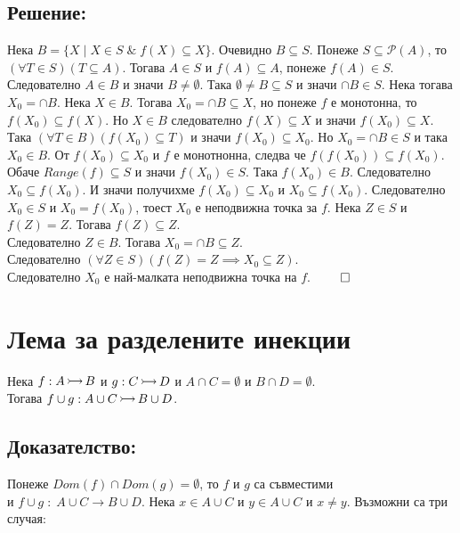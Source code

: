 \documentclass[12pt]{article}
\newcommand{\injection}[0]{\,\mathlarger{\mathlarger{\rightarrowtail}}\,}
\begin{document}
\subsection*{Решение:}
Нека \(B = \{X \; | \; X \in S \; \& \; f(X) \subseteq X\}\).
Очевидно \(B \subseteq S\). Понеже \(S \subseteq \mathcal{P}(A)\),
то \((\forall T \in S)(T \subseteq A)\). Тогава \(A \in S\)
и \(f(A) \subseteq A\), понеже \(f(A) \in S\). Следователно
\(A \in B\) и значи \(B \neq \emptyset\).
Така \(\emptyset \neq B \subseteq S\) и значи \(\cap B \in S\).
Нека тогава \(X_0 = \cap B\). Нека \(X \in B\).
Тогава \(X_0 = \cap B \subseteq X\), но понеже \(f\) е монотонна,
то \(f(X_0) \subseteq f(X)\). Но \(X \in B\) следователно
\(f(X) \subseteq X\) и значи \(f(X_0) \subseteq X\).
Така \((\forall T \in B)(f(X_0) \subseteq T)\) и значи
\(f(X_0) \subseteq X_0\). Но \(X_0 = \cap B \in S\)
и така \(X_0 \in B\). От \(f(X_0) \subseteq X_0\) и \(f\)
е монотнонна, следва че \(f(f(X_0)) \subseteq f(X_0)\).
Обаче \(Range(f) \subseteq S\) и значи \(f(X_0) \in S\).
Така \(f(X_0) \in B\). Следователно \(X_0 \subseteq f(X_0)\).
И значи получихме \(f(X_0) \subseteq X_0\) и \(X_0 \subseteq f(X_0)\).
Следователно \(X_0 \in S\) и \(X_0 = f(X_0)\), тоест \(X_0\) е неподвижна точка за \(f\).
Нека \(Z \in S\) и \(f(Z) = Z\). Тогава \(f(Z) \subseteq Z\). \\
Следователно \(Z \in B\). Тогава \(X_0 = \cap B \subseteq Z\). \\
Следователно \((\forall Z \in S)(f(Z) = Z \implies X_0 \subseteq Z)\). \\
Следователно \(X_0\) е най-малката неподвижна точка на \(f\). \(\qed\)

\section*{Лема за разделените инекции}
Нека \(f : A \injection B\) и \(g : C \injection D\)
и \(A \cap C = \emptyset\) и \(B \cap D = \emptyset\).
\\
Тогава \(f \cup g : A \cup C \injection B \cup D\).

\subsection*{Доказателство:}
Понеже \(Dom(f) \cap Dom(g) = \emptyset\), то \(f\) и \(g\) са съвместими
\\
и \(f \cup g \; : \; A \cup C \to B \cup D\).
Нека \(x \in A \cup C\) и \(y \in A \cup C\) и \(x \neq y\).
Възможни са три случая:
\end{document}
